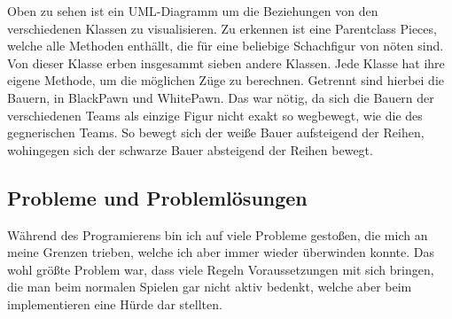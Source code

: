 \documentclass[a4paper, 10pt]{scrartcl}
\begin{document}
Oben zu sehen ist ein UML-Diagramm um die Beziehungen von den verschiedenen
Klassen zu visualisieren. Zu erkennen ist eine Parentclass \glqq{}Pieces\grqq ,
welche alle Methoden enthällt, die für eine beliebige Schachfigur von nöten sind.
Von dieser Klasse erben insgesammt sieben andere Klassen. Jede Klasse hat ihre eigene
Methode, um die möglichen Züge zu berechnen. Getrennt sind hierbei die Bauern, in
BlackPawn und WhitePawn. Das war nötig, da sich die Bauern der verschiedenen Teams als
einzige Figur nicht exakt so wegbewegt, wie die des gegnerischen Teams. So bewegt sich
der weiße Bauer aufsteigend der Reihen, wohingegen sich der schwarze Bauer absteigend der
Reihen bewegt. 

\subsection{Probleme und Problemlösungen}
Während des Programierens bin ich auf viele Probleme gestoßen, die mich an meine Grenzen trieben, welche ich aber immer wieder überwinden konnte.
Das wohl größte Problem war, dass viele Regeln Voraussetzungen mit sich bringen, die man beim normalen Spielen gar nicht aktiv bedenkt, welche aber
beim implementieren eine Hürde dar stellten.
\end{document}
